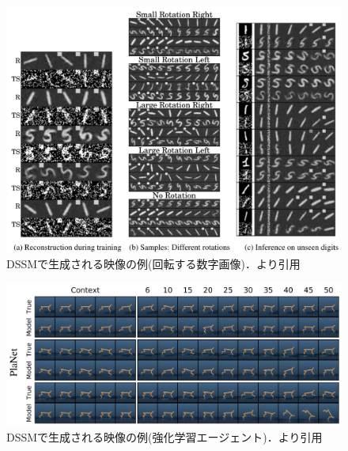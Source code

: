 \begin{figure}[bp]
  \begin{center}
    \includegraphics[width=\linewidth]{./figures/dssm_dkf.png}
    \caption[DSSMで生成される映像の例(回転する数字画像)]{DSSMで生成される映像の例(回転する数字画像)．\cite{krishnan2015deep}より引用}
    \label{fig:dssm_dkf}
  \end{center}
\end{figure}

\begin{figure}[tbp]
  \begin{center}
    \includegraphics[width=\linewidth]{./figures/dssm_planet.png}
    \caption[DSSMで生成される映像の例(強化学習エージェント)]{DSSMで生成される映像の例(強化学習エージェント)．\cite{hafner2019planet}より引用}
    \label{fig:dssm_planet}
  \end{center}
\end{figure}

